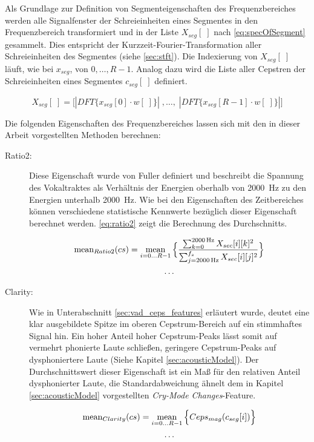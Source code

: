 Als Grundlage zur Definition von Segmenteigenschaften des Frequenzbereiches werden alle Signalfenster der Schreieinheiten eines Segmentes in den Frequenzbereich transformiert und in der Liste $X_{seg}[\;]$ nach \autoref{eq:specOfSegment} gesammelt. Dies entspricht der Kurzzeit-Fourier-Transformation aller Schreieinheiten des Segmentes (siehe \autoref{sec:stft}). Die Indexierung von $X_{seg}[\;]$ läuft, wie bei $x_{seg}$, von $0 , \ldots , R-1$. Analog dazu wird die Liste aller Cepstren der Schreieinheiten eines Segmentes $c_{seg}[\;]$ definiert. 

\begin{equation}
X_{seg}[\; ] = \Big[ |DFT\{x_{seg}[0] \cdot w[\;]\}| \; , \ldots , \; |DFT\{x_{seg}[R-1] \cdot w[\;]\}| \Big]
\label{eq:specOfSegment}
\end{equation}


Die folgenden Eigenschaften des Frequenzbereiches lassen sich mit den in dieser Arbeit vorgestellten Methoden berechnen:

\begin{description}
\item[Ratio2:] Diese Eigenschaft wurde von Fuller \cite{threeCryTypes} definiert und beschreibt die Spannung des Vokaltraktes als Verhältnis der Energien oberhalb von \SI{2000}{\hertz} zu den Energien unterhalb \SI{2000}{\hertz}. Wie bei den Eigenschaften des Zeitbereiches können verschiedene statistische Kennwerte bezüglich dieser Eigenschaft berechnet werden. \autoref{eq:ratio2} zeigt die Berechnung des Durchschnitts.

\begin{equation}
\begin{gathered}
\text{mean}_{Ratio2}(cs) = \operatorname*{mean}_{i=0\ldots R-1} \Big\{ \frac{\sum_{k=0}^{\SI{2000}{\hertz}} X_{sec}[i][k]^2}{\sum_{j=\SI{2000}{\hertz}}^{f_{s}} X_{sec}[i][j]^2} \Big\} \\
\ldots
\end{gathered}
\label{eq:ratio2}
\end{equation}


\item[Clarity: ] Wie in Unterabschnitt \ref{sec:vad_ceps_features} erläutert wurde, deutet eine klar ausgebildete Spitze im oberen Cepstrum-Bereich auf ein stimmhaftes Signal hin. Ein hoher Anteil hoher Cepstrum-Peaks lässt somit auf vermehrt phonierte Laute schließen, geringere Cepstrum-Peaks auf dysphoniertere Laute (Siehe Kapitel \ref{sec:acousticModel}). Der Durchschnittswert dieser Eigenschaft ist ein Maß für den relativen Anteil dysphonierter Laute, die Standardabweichung ähnelt dem in Kapitel \ref{sec:acousticModel} vorgestellten \emph{Cry-Mode Changes}-Feature.

\begin{equation}
\begin{gathered}
\text{mean}_{Clarity}(cs) = \operatorname*{mean}_{i=0\ldots R-1} \Big\{ Ceps_{mag}(c_{seg}[i])  \Big\} \\
\ldots
\end{gathered}
\end{equation}
	
	
\end{description}

